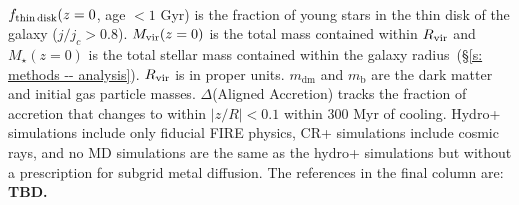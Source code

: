 \documentclass[fleqn,usenatbib]{mnras}
\begin{document}
\begin{table}
\begin{tabular}{cccccccc}
\hline
\end{tabular}
\\
\begin{flushleft}
$f_{\rm thin\,disk}(z=0$, age $<1$ Gyr) is the fraction of young stars in the thin disk of the galaxy ($j/j_c > 0.8$).
$M_{\rm vir}(z=0)$ is the total mass contained within $R_{\rm vir}$ and $M_\star(z=0)$ is the total stellar mass contained within the galaxy radius~(\S\ref{s: methods -- analysis}). 
$R_{\rm vir}$ is in proper units.
$m_{\textrm{dm}}$ and $m_\textrm{b}$ are the dark matter and initial gas particle masses.
$\Delta$(Aligned Accretion) tracks the fraction of accretion that changes to within $\vert z/R \vert <0.1$ within 300 Myr of cooling.
Hydro+ simulations include only fiducial FIRE physics, CR+ simulations include cosmic rays, and no MD simulations are the same as the hydro+ simulations but without a prescription for subgrid metal diffusion.
The references in the final column are:
\textbf{TBD.}
\end{flushleft}
\label{table: simulations_used}
\end{table}

\end{document}
